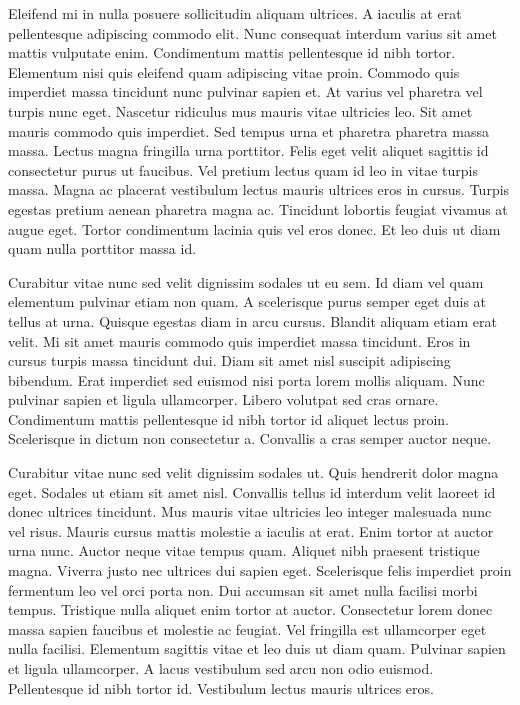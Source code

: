 \documentclass[11pt,a4paper]{article}
\begin{document}
Eleifend mi in nulla posuere sollicitudin aliquam ultrices. A iaculis at erat pellentesque adipiscing commodo elit. Nunc consequat interdum varius sit amet mattis vulputate enim. Condimentum mattis pellentesque id nibh tortor. Elementum nisi quis eleifend quam adipiscing vitae proin. Commodo quis imperdiet massa tincidunt nunc pulvinar sapien et. At varius vel pharetra vel turpis nunc eget. Nascetur ridiculus mus mauris vitae ultricies leo. Sit amet mauris commodo quis imperdiet. Sed tempus urna et pharetra pharetra massa massa. Lectus magna fringilla urna porttitor. Felis eget velit aliquet sagittis id consectetur purus ut faucibus. Vel pretium lectus quam id leo in vitae turpis massa. Magna ac placerat vestibulum lectus mauris ultrices eros in cursus. Turpis egestas pretium aenean pharetra magna ac. Tincidunt lobortis feugiat vivamus at augue eget. Tortor condimentum lacinia quis vel eros donec. Et leo duis ut diam quam nulla porttitor massa id.

Curabitur vitae nunc sed velit dignissim sodales ut eu sem. Id diam vel quam elementum pulvinar etiam non quam. A scelerisque purus semper eget duis at tellus at urna. Quisque egestas diam in arcu cursus. Blandit aliquam etiam erat velit. Mi sit amet mauris commodo quis imperdiet massa tincidunt. Eros in cursus turpis massa tincidunt dui. Diam sit amet nisl suscipit adipiscing bibendum. Erat imperdiet sed euismod nisi porta lorem mollis aliquam. Nunc pulvinar sapien et ligula ullamcorper. Libero volutpat sed cras ornare. Condimentum mattis pellentesque id nibh tortor id aliquet lectus proin. Scelerisque in dictum non consectetur a. Convallis a cras semper auctor neque.

Curabitur vitae nunc sed velit dignissim sodales ut. Quis hendrerit dolor magna eget. Sodales ut etiam sit amet nisl. Convallis tellus id interdum velit laoreet id donec ultrices tincidunt. Mus mauris vitae ultricies leo integer malesuada nunc vel risus. Mauris cursus mattis molestie a iaculis at erat. Enim tortor at auctor urna nunc. Auctor neque vitae tempus quam. Aliquet nibh praesent tristique magna. Viverra justo nec ultrices dui sapien eget. Scelerisque felis imperdiet proin fermentum leo vel orci porta non. Dui accumsan sit amet nulla facilisi morbi tempus. Tristique nulla aliquet enim tortor at auctor. Consectetur lorem donec massa sapien faucibus et molestie ac feugiat. Vel fringilla est ullamcorper eget nulla facilisi. Elementum sagittis vitae et leo duis ut diam quam. Pulvinar sapien et ligula ullamcorper. A lacus vestibulum sed arcu non odio euismod. Pellentesque id nibh tortor id. Vestibulum lectus mauris ultrices eros.
\end{document}
